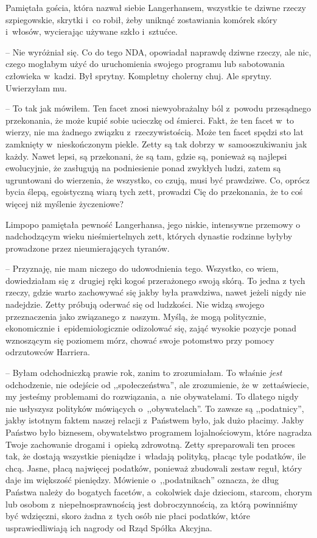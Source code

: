 \documentclass[oneside,polish,11pt,sfheadings]{mwbk}
\begin{document}
Pamiętała gościa, która nazwał siebie Langerhansem, wszystkie te dziwne
rzeczy szpiegowskie, skrytki i~co robił, żeby uniknąć zostawiania
komórek skóry i~włosów, wycierając używane szkło i~sztućce. 

-- Nie wyróżniał się. Co do tego NDA, opowiadał naprawdę dziwne rzeczy, ale
nic, czego mogłabym użyć do uruchomienia swojego programu lub
sabotowania człowieka w~kadzi. Był sprytny. Kompletny cholerny chuj. Ale
sprytny. Uwierzyłam mu.

-- To tak jak mówiłem. Ten facet znosi niewyobrażalny ból z~powodu
przesądnego przekonania, że może kupić sobie ucieczkę od śmierci. Fakt,
że ten facet w~to wierzy, nie ma żadnego związku z~rzeczywistością. Może
ten facet spędzi sto lat zamknięty w~nieskończonym piekle. Zetty są tak
dobrzy w~samooszukiwaniu jak każdy. Nawet lepsi, są przekonani, że są
tam, gdzie są, ponieważ są najlepsi ewolucyjnie, że zasługują na
podniesienie ponad zwykłych ludzi, zatem są ugruntowani do wierzenia, że
wszystko, co czują, musi być prawdziwe. Co, oprócz bycia ślepą,
egoistyczną wiarą tych zett, prowadzi Cię do przekonania, że to coś
więcej niż myślenie życzeniowe?

Limpopo pamiętała pewność Langerhansa, jego niskie, intensywne przemowy
o nadchodzącym wieku nieśmiertelnych zett, których dynastie rodzinne
byłyby prowadzone przez nieumierających tyranów.

-- Przyznaję, nie mam niczego do udowodnienia tego. Wszystko, co wiem,
dowiedziałam się z~drugiej ręki kogoś przerażonego swoją skórą. To jedna
z tych rzeczy, gdzie warto zachowywać się jakby była prawdziwa, nawet
jeżeli nigdy nie nadejdzie. Zetty próbują oderwać się od ludzkości. Nie
widzą swojego przeznaczenia jako związanego z~naszym. Myślą, że mogą
politycznie, ekonomicznie i~epidemiologicznie odizolować się, zająć
wysokie pozycje ponad wznoszącym się poziomem mórz, chować swoje
potomstwo przy pomocy odrzutowców Harriera.

-- Byłam odchodniczką prawie rok, zanim to zrozumiałam. To właśnie
\textit{jest} odchodzenie, nie odejście od ,,społeczeństwa'', ale
zrozumienie, że w~zettaświecie, my jesteśmy problemami do rozwiązania, a~nie obywatelami. To dlatego nigdy nie usłyszysz polityków mówiących o~,,obywatelach''. To zawsze są ,,podatnicy'', jakby istotnym faktem
naszej relacji z~Państwem było, jak dużo płacimy. Jakby Państwo było
biznesem, obywatelstwo programem lojalnościowym, które nagradza Twoje
zachowanie drogami i~opieką zdrowotną. Zetty spreparowali ten proces
tak, że dostają wszystkie pieniądze i~władają polityką, płacąc tyle
podatków, ile chcą. Jasne, płacą najwięcej podatków, ponieważ zbudowali
zestaw reguł, który daje im większość pieniędzy. Mówienie o~,,podatnikach'' oznacza, że dług Państwa należy do bogatych facetów, a~cokolwiek daje dzieciom, starcom, chorym lub osobom z~niepełnosprawnością jest dobroczynnością, za którą powinniśmy być
wdzięczni, skoro żadna z~tych osób nie płaci podatków, które
usprawiedliwiają ich nagrody od Rząd Spółka Akcyjna.
\end{document}
